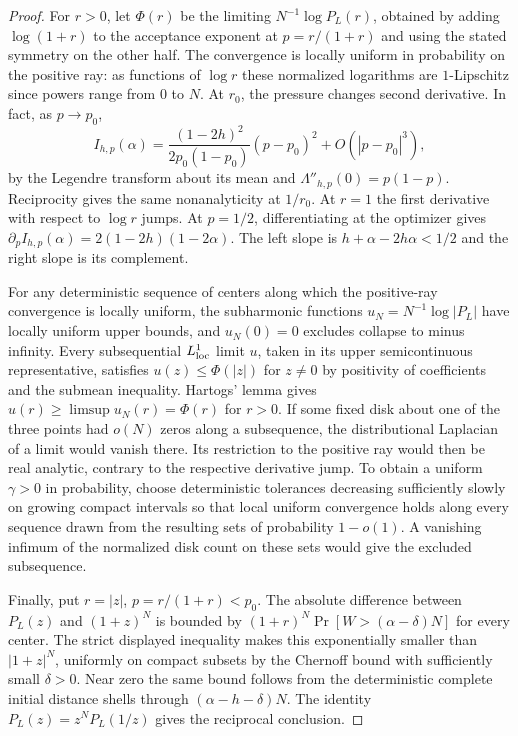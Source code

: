 \begin{proof}
For \(r>0\), let \(\Phi(r)\) be the limiting \(N^{-1}\log P_L(r)\), obtained by adding \(\log(1+r)\) to the acceptance exponent at \(p=r/(1+r)\) and using the stated symmetry on the other half. The convergence is locally uniform in probability on the positive ray: as functions of \(\log r\) these normalized logarithms are \(1\)-Lipschitz since powers range from \(0\) to \(N\). At \(r_0\), the pressure changes second derivative. In fact, as \(p\to p_0\),
\[
 I_{h,p}(\alpha)=
 \frac{(1-2h)^2}{2p_0(1-p_0)}(p-p_0)^2+O(|p-p_0|^3),
\]
by the Legendre transform about its mean and \(\Lambda''_{h,p}(0)=p(1-p)\). Reciprocity gives the same nonanalyticity at \(1/r_0\). At \(r=1\) the first derivative with respect to \(\log r\) jumps. At \(p=1/2\), differentiating at the optimizer gives \(\partial_p I_{h,p}(\alpha)=2(1-2h)(1-2\alpha)\). The left slope is \(h+\alpha-2h\alpha<1/2\) and the right slope is its complement.

For any deterministic sequence of centers along which the positive-ray convergence is locally uniform, the subharmonic functions \(u_N=N^{-1}\log|P_L|\) have locally uniform upper bounds, and \(u_N(0)=0\) excludes collapse to minus infinity. Every subsequential \(L^1_{\rm loc}\) limit \(u\), taken in its upper semicontinuous representative, satisfies \(u(z)\le\Phi(|z|)\) for \(z\ne0\) by positivity of coefficients and the submean inequality. Hartogs' lemma gives \(u(r)\ge\limsup u_N(r)=\Phi(r)\) for \(r>0\). If some fixed disk about one of the three points had \(o(N)\) zeros along a subsequence, the distributional Laplacian of a limit would vanish there. Its restriction to the positive ray would then be real analytic, contrary to the respective derivative jump. To obtain a uniform \(\gamma>0\) in probability, choose deterministic tolerances decreasing sufficiently slowly on growing compact intervals so that local uniform convergence holds along every sequence drawn from the resulting sets of probability \(1-o(1)\). A vanishing infimum of the normalized disk count on these sets would give the excluded subsequence.

Finally, put \(r=|z|\), \(p=r/(1+r)<p_0\). The absolute difference between \(P_L(z)\) and \((1+z)^N\) is bounded by \((1+r)^N\Pr[W>(\alpha-\delta)N]\) for every center. The strict displayed inequality makes this exponentially smaller than \(|1+z|^N\), uniformly on compact subsets by the Chernoff bound with sufficiently small \(\delta>0\). Near zero the same bound follows from the deterministic complete initial distance shells through \((\alpha-h-\delta)N\). The identity \(P_L(z)=z^N P_L(1/z)\) gives the reciprocal conclusion.
\end{proof}

